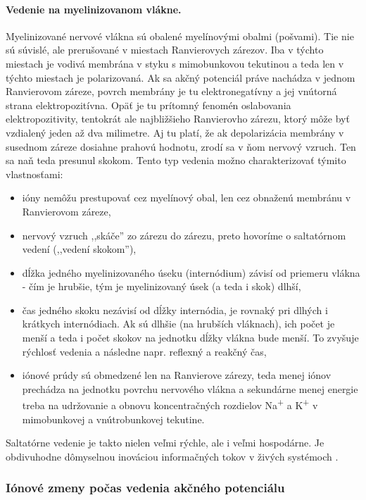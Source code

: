 \paragraph{Vedenie na myelinizovanom vlákne.}
Myelinizované nervové vlákna sú obalené myelínovými obalmi (pošvami). Tie nie sú súvislé, ale prerušované v miestach Ranvierovych zárezov. Iba v týchto miestach je vodivá membrána v styku s mimobunkovou 
tekutinou a teda len v týchto miestach je polarizovaná. Ak sa akčný potenciál práve nachádza v jednom Ranvierovom záreze, povrch membrány je tu elektronegatívny a jej vnútorná strana 
elektropozitívna. Opäť je tu prítomný fenomén oslabovania elektropozitivity, tentokrát ale najbližšieho Ranvierovho zárezu, ktorý môže byť vzdialený jeden až dva milimetre. Aj tu platí, že ak
depolarizácia membrány v susednom záreze dosiahne prahovú hodnotu, zrodí sa v ňom nervový vzruch. Ten sa naň teda presunul skokom. Tento typ vedenia možno charakterizovať týmito vlastnosťami:

\begin{itemize}
  \item ióny nemôžu prestupovať cez myelínový obal, len cez obnaženú membránu v Ranvierovom záreze,
  \item nervový vzruch ,,skáče'' zo zárezu do zárezu, preto hovoríme o saltatórnom vedení (,,vedení skokom''),
  \item dĺžka jedného myelinizovaného úseku (internódium) závisí od priemeru vlákna - čím je hrubšie, tým je myelinizovaný úsek (a teda i skok) dlhší,
  \item čas jedného skoku nezávisí od dĺžky internódia, je rovnaký pri dlhých i krátkych internódiach. Ak sú dlhšie (na hrubších vláknach), ich počet je menší a teda i počet skokov na jednotku dĺžky vlákna bude menší. To zvyšuje rýchlosť vedenia a následne napr. reflexný a reakčný čas,
  \item iónové prúdy sú obmedzené len na Ranvierove zárezy, teda menej iónov prechádza na jednotku povrchu nervového vlákna a sekundárne menej energie treba na udržovanie a obnovu koncentračných rozdielov Na\textsuperscript{+} a K\textsuperscript{+} v mimobunkovej a vnútrobunkovej tekutine.
\end{itemize}

Saltatórne vedenie je takto nielen veľmi rýchle, ale i veľmi hospodárne. Je obdivuhodne dômyselnou inováciou informačných tokov v živých systémoch \cite{bederFyziologiaCloveka2005}.

\subsubsection{Iónové zmeny počas vedenia akčného potenciálu}

